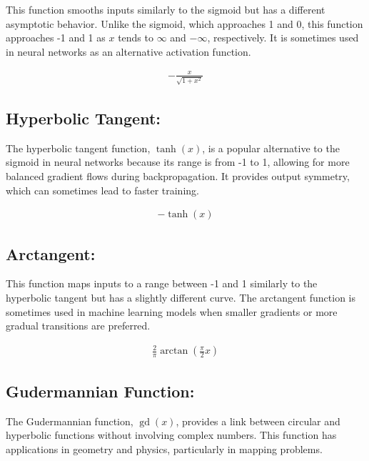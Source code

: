 \documentclass[
  12 pt,
  a4paper,
]{book}
\numberwithin{equation}{section}
\theoremstyle{plain}      %
\theoremstyle{definition} %
\theoremstyle{remark}     %
\theoremstyle{note}         %
\begin{document}
This function smooths inputs similarly to the sigmoid but has a
different asymptotic behavior. Unlike the sigmoid, which approaches 1
and 0, this function approaches -1 and 1 as \(x\) tends to \(\infty\)
and \(-\infty\), respectively. It is sometimes used in neural networks
as an alternative activation function.

\begin{align}
-\frac{x}{\sqrt{1+x^2}}
\end{align}

\hypertarget{hyperbolic-tangent}{%
\subsection{Hyperbolic Tangent:}\label{hyperbolic-tangent}}

The hyperbolic tangent function, \(\tanh(x)\), is a popular alternative
to the sigmoid in neural networks because its range is from -1 to 1,
allowing for more balanced gradient flows during backpropagation. It
provides output symmetry, which can sometimes lead to faster training.

\begin{align}
-\tanh(x)
\end{align}

\hypertarget{arctangent}{%
\subsection{Arctangent:}\label{arctangent}}

This function maps inputs to a range between -1 and 1 similarly to the
hyperbolic tangent but has a slightly different curve. The arctangent
function is sometimes used in machine learning models when smaller
gradients or more gradual transitions are preferred.

\begin{align}
\frac{2}{\pi} \arctan \left(\frac{\pi}{2} x\right)
\end{align}

\hypertarget{gudermannian-function}{%
\subsection{Gudermannian Function:}\label{gudermannian-function}}

The Gudermannian function, \(\operatorname{gd}(x)\), provides a link
between circular and hyperbolic functions without involving complex
numbers. This function has applications in geometry and physics,
particularly in mapping problems.
\end{document}
